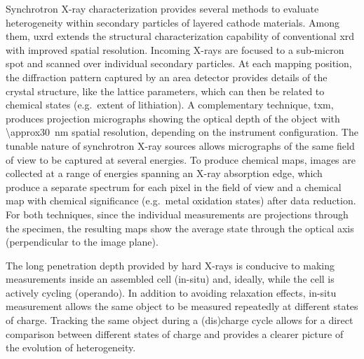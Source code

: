 \documentclass{article}
\begin{document}

Synchrotron X-ray characterization provides several methods to
evaluate heterogeneity within secondary particles of layered cathode
materials\cite{doeff2017}. Among them, \Gls{uxrd} extends the structural characterization
capability of conventional \gls{xrd} with improved spatial
resolution. Incoming X-rays are focused to a sub-micron spot and
scanned over individual secondary particles. At each mapping position,
the diffraction pattern captured by an area detector provides details
of the crystal structure, like the lattice parameters, which can then
be related to chemical states (e.g.\ extent of lithiation). A
complementary technique, \Gls{txm}, produces projection micrographs
showing the optical depth of the object with \SI{\approx30}{nm}
spatial resolution, depending on the instrument configuration. The
tunable nature of synchrotron X-ray sources allows micrographs of the
same field of view to be captured at several energies. To produce
chemical maps, images are collected at a range of energies spanning an
X-ray absorption edge, which produce a separate spectrum for each
pixel in the field of view and a chemical map with chemical
significance (e.g.\ metal oxidation states) after data reduction. For
both techniques, since the individual measurements are projections
through the specimen, the resulting maps show the average state
through the optical axis (perpendicular to the image plane).

The long penetration depth provided by hard X-rays is conducive to
making measurements inside an assembled cell (in-situ) and, ideally,
while the cell is actively cycling (operando). In addition to avoiding
relaxation effects, in-situ measurement allows the same object to be
measured repeatedly at different states of charge. Tracking the same
object during a (dis)charge cycle allows for a direct comparison
between different states of charge and provides a clearer picture of
the evolution of heterogeneity.



\end{document}

